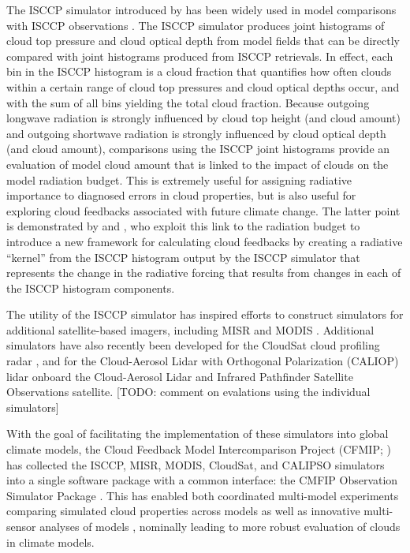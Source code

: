 The ISCCP simulator introduced by \citet{klein_and_jakob_1999} has been
widely used in model comparisons with ISCCP observations
\citep{webb_et_al_2001, norris_and_weaver_2001, lin_and_zhang_2004, zhang_et_al_2005, wyant_et_al_2006, klein_et_al_2013}.
The ISCCP simulator produces joint histograms of cloud top pressure and
cloud optical depth from model fields that can be directly compared with
joint histograms produced from ISCCP retrievals. In effect, each bin in
the ISCCP histogram is a cloud fraction that quantifies how often clouds
within a certain range of cloud top pressures and cloud optical depths
occur, and with the sum of all bins yielding the total cloud fraction.
Because outgoing longwave radiation is strongly influenced by cloud top
height (and cloud amount) and outgoing shortwave radiation is strongly
influenced by cloud optical depth (and cloud amount), comparisons using
the ISCCP joint histograms provide an evaluation of model cloud amount
that is linked to the impact of clouds on the model radiation budget.
This is extremely useful for assigning radiative importance to diagnosed
errors in cloud properties, but is also useful for exploring cloud
feedbacks associated with future climate change. The latter point is
demonstrated by \citet{zelinka_et_al_2012a} and
\citet{zelinka_et_al_2012b}, who exploit this link to the radiation
budget to introduce a new framework for calculating cloud feedbacks by
creating a radiative ``kernel'' from the ISCCP histogram output by the
ISCCP simulator that represents the change in the radiative forcing that
results from changes in each of the ISCCP histogram components.

The utility of the ISCCP simulator has inspired efforts to construct
simulators for additional satellite-based imagers, including MISR
\citep{marchand_and_ackerman_2010} and MODIS \citep{pincus_et_al_2012}.
Additional simulators have also recently been developed for the CloudSat
\citep{stephens_et_al_2002} cloud profiling radar
\citep[Quickbeam;][]{haynes_et_al_2007}, and for the Cloud-Aerosol Lidar
with Orthogonal Polarization (CALIOP) lidar \citep{chepfer_et_al_2008}
onboard the Cloud-Aerosol Lidar and Infrared Pathfinder Satellite
Observations \citep[CALIPSO][]{winker_et_al_2007} satellite. {[}TODO:
comment on evalations using the individual simulators{]}

With the goal of facilitating the implementation of these simulators
into global climate models, the Cloud Feedback Model Intercomparison
Project (CFMIP; \citep{webb_et_al_2016}) has collected the ISCCP, MISR,
MODIS, CloudSat, and CALIPSO simulators into a single software package
with a common interface: the CMFIP Observation Simulator Package
\citep[COSP;][]{bodas-salcedo_et_al_2011}. This has enabled both
coordinated multi-model experiments comparing simulated cloud properties
across models as well as innovative multi-sensor analyses of models
\citep[e.g.,][]{bodas-salcedo_et_al_2011, kay_et_al_2012, klein_et_al_2013},
nominally leading to more robust evaluation of clouds in climate models.

